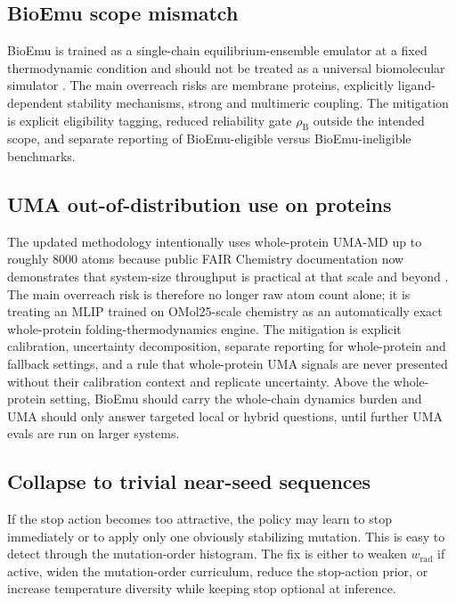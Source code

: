 \documentclass[11pt]{article}
\begin{document}
	\subsection{BioEmu scope mismatch}
	
	BioEmu is trained as a single-chain equilibrium-ensemble emulator at a fixed thermodynamic condition and should not be treated as a universal biomolecular simulator \citep{lewis2024bioemu}. The main overreach risks are membrane proteins, explicitly ligand-dependent stability mechanisms, strong and multimeric coupling. The mitigation is explicit eligibility tagging, reduced reliability gate $\rho_{\mathrm B}$ outside the intended scope, and separate reporting of BioEmu-eligible versus BioEmu-ineligible benchmarks.
	
	\subsection{UMA out-of-distribution use on proteins}
	
	The updated methodology intentionally uses whole-protein UMA-MD up to roughly $8000$ atoms because public FAIR Chemistry documentation now demonstrates that system-size throughput is practical at that scale and beyond \citep{fairchem2025github}. The main overreach risk is therefore no longer raw atom count alone; it is treating an MLIP trained on OMol25-scale chemistry as an automatically exact whole-protein folding-thermodynamics engine. The mitigation is explicit calibration, uncertainty decomposition, separate reporting for whole-protein and fallback settings, and a rule that whole-protein UMA signals are never presented without their calibration context and replicate uncertainty. Above the whole-protein setting, BioEmu should carry the whole-chain dynamics burden and UMA should only answer targeted local or hybrid questions, until further UMA evals are run on larger systems. 
	
	\subsection{Collapse to trivial near-seed sequences}
	
	If the stop action becomes too attractive, the policy may learn to stop immediately or to apply only one obviously stabilizing mutation. This is easy to detect through the mutation-order histogram. The fix is either to weaken $w_{\mathrm{rad}}$ if active, widen the mutation-order curriculum, reduce the stop-action prior, or increase temperature diversity while keeping stop optional at inference.
	
\end{document}
